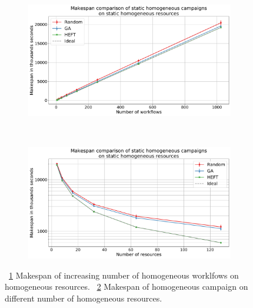 \begin{figure}[ht!]
    \centering
    \begin{subfigure}[b]{0.45\textwidth}
        \includegraphics[width=.95\textwidth]{figures/campaign/StHomoCampaigns_4StHomoResources.pdf}
        \caption{}
        \label{fig:StHomoCampaigns_4StHomoResources}
    \end{subfigure}%
    ~ 
    \begin{subfigure}[b]{0.45\textwidth}
        \includegraphics[width=\linewidth]{figures/campaign/StHomoResources_StHomoCampaigns.pdf}
        \caption{}
        \label{fig:StHomoResources_StHomoCampaigns}
    \end{subfigure}
    \caption{~\ref{fig:StHomoCampaigns_4StHomoResources} Makespan of increasing number of homogeneous worklfows on homogeneous resources.
    ~\ref{fig:StHomoResources_StHomoCampaigns} Makespan of homogeneous campaign on different number of homogeneous resources.}
    \label{fig:dyn_homog_analysis}
\end{figure}




